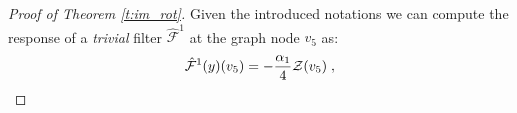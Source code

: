 \documentclass[10pt,journal,compsoc]{IEEEtran}
\newcommand{\hmF}{\hat{\mathcal{F}}}
\begin{document}
\begin{proof}[Proof of Theorem \ref{t:im_rot}]
		
		Given the introduced notations we can compute the response of a \emph{trivial} filter $\hmF^1$ at the graph node $v_5$ as:
		\begin{equation}
		\small
		\hmF^1(y)(v_5) = - \frac{\alpha_1 }{4} \mathcal{Z}(v_5)\;,
		\label{eq:response_pat_o}
		\end{equation}
		

\end{proof}
\end{document}
